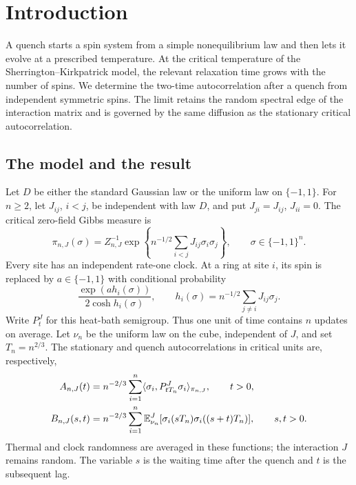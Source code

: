 \section{Introduction}\label{sec:introduction}

A quench starts a spin system from a simple nonequilibrium law and then
lets it evolve at a prescribed temperature. At the critical temperature
of the Sherrington--Kirkpatrick model, the relevant relaxation time grows
with the number of spins. We determine the two-time autocorrelation after
a quench from independent symmetric spins. The limit retains the random
spectral edge of the interaction matrix and is governed by the same
diffusion as the stationary critical autocorrelation.

\subsection{The model and the result}

Let \(D\) be either the standard Gaussian law or the uniform law on
\(\{-1,1\}\). For \(n\ge2\), let \(J_{ij}\), \(i<j\), be independent with
law \(D\), and put \(J_{ji}=J_{ij}\), \(J_{ii}=0\). The critical zero-field
Gibbs measure is
\begin{equation}\label{eq:gibbs}
 \pi_{n,J}(\sigma)
 =Z_{n,J}^{-1}
   \exp\left\{n^{-1/2}\sum_{i<j}J_{ij}\sigma_i\sigma_j\right\},
 \qquad \sigma\in\{-1,1\}^n .
\end{equation}
Every site has an independent rate-one clock. At a ring at site \(i\), its
spin is replaced by \(a\in\{-1,1\}\) with conditional probability
\[
 \frac{\exp(a h_i(\sigma))}{2\cosh h_i(\sigma)},
 \qquad
 h_i(\sigma)=n^{-1/2}\sum_{j\ne i}J_{ij}\sigma_j .
\]
Write \(P_t^J\) for this heat-bath semigroup. Thus one unit of time contains
\(n\) updates on average. Let \(\nu_n\) be the uniform law on the cube,
independent of \(J\), and set \(T_n=n^{2/3}\). The stationary and quench
autocorrelations in critical units are, respectively,
\begin{align}
 A_{n,J}(t)
   &=n^{-2/3}\sum_{i=1}^n
      \langle \sigma_i,P_{tT_n}^J\sigma_i\rangle_{\pi_{n,J}},
       \qquad t>0,                                      \label{eq:finite-A}\\
 B_{n,J}(s,t)
   &=n^{-2/3}\sum_{i=1}^n
      \mathbb E_{\nu_n}^J[\sigma_i(sT_n)\sigma_i((s+t)T_n)],
       \qquad s,t>0.                                    \label{eq:finite-B}
\end{align}
Thermal and clock randomness are averaged in these functions; the
interaction \(J\) remains random. The variable \(s\) is the waiting time
after the quench and \(t\) is the subsequent lag.

